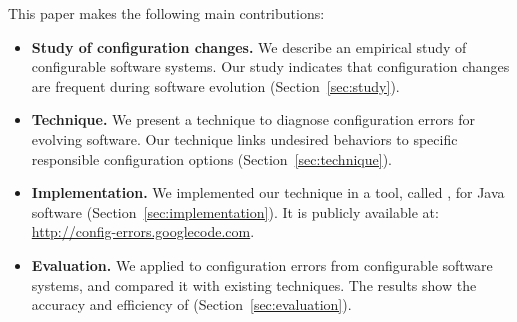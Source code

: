 This paper makes the following main contributions:

\begin{itemize}
\item \textbf{Study of configuration changes.} We describe an empirical
study of \studysubjnum configurable software systems.
Our study indicates that configuration changes
are frequent during software evolution (Section~\ref{sec:study}).

\item \textbf{Technique.} We present a technique to diagnose
configuration errors for evolving software. Our technique
links undesired behaviors to
specific responsible configuration options (Section~\ref{sec:technique}).

\item \textbf{Implementation.} We implemented our technique
in a tool, called \ourtool, for Java software (Section~\ref{sec:implementation}).
It is publicly available at: \url{http://config-errors.googlecode.com}.

\item \textbf{Evaluation.} We applied \ourtool to \errornum configuration
errors from \subjnum configurable software systems,
and compared it with existing techniques.
The results show the accuracy and efficiency of \ourtool (Section~\ref{sec:evaluation}).
\end{itemize}


\newpage
